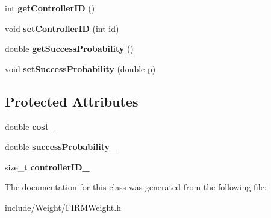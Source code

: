 \begin{DoxyCompactItemize}
\item 
\hypertarget{class_f_i_r_m_weight_af846636ead4117eee04ca622b0985c0f}{int {\bfseries get\-Controller\-I\-D} ()}\label{class_f_i_r_m_weight_af846636ead4117eee04ca622b0985c0f}

\item 
\hypertarget{class_f_i_r_m_weight_a7b19ae273970b48e156f79a2ef085b71}{void {\bfseries set\-Controller\-I\-D} (int id)}\label{class_f_i_r_m_weight_a7b19ae273970b48e156f79a2ef085b71}

\item 
\hypertarget{class_f_i_r_m_weight_a06b9e832fb364609e8d55fa9b4822dd9}{double {\bfseries get\-Success\-Probability} ()}\label{class_f_i_r_m_weight_a06b9e832fb364609e8d55fa9b4822dd9}

\item 
\hypertarget{class_f_i_r_m_weight_a464ea0457387ec93efa2342d27789d3e}{void {\bfseries set\-Success\-Probability} (double p)}\label{class_f_i_r_m_weight_a464ea0457387ec93efa2342d27789d3e}

\end{DoxyCompactItemize}
\subsection*{\-Protected \-Attributes}
\begin{DoxyCompactItemize}
\item 
\hypertarget{class_f_i_r_m_weight_a87d6234da67d63e0ee378f4817ba79b6}{double {\bfseries cost\-\_\-}}\label{class_f_i_r_m_weight_a87d6234da67d63e0ee378f4817ba79b6}

\item 
\hypertarget{class_f_i_r_m_weight_a11e740f671713d5859367648434f4b17}{double {\bfseries success\-Probability\-\_\-}}\label{class_f_i_r_m_weight_a11e740f671713d5859367648434f4b17}

\item 
\hypertarget{class_f_i_r_m_weight_a25113f31344f98970105be8c54a2f78d}{size\-\_\-t {\bfseries controller\-I\-D\-\_\-}}\label{class_f_i_r_m_weight_a25113f31344f98970105be8c54a2f78d}

\end{DoxyCompactItemize}


\-The documentation for this class was generated from the following file\-:\begin{DoxyCompactItemize}
\item 
include/\-Weight/\-F\-I\-R\-M\-Weight.\-h\end{DoxyCompactItemize}
